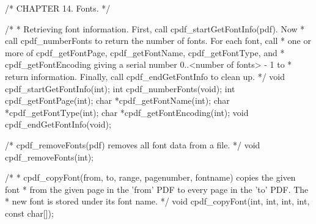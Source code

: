 /* CHAPTER 14. Fonts. */

/*
 * Retrieving font information. First, call cpdf_startGetFontInfo(pdf). Now
 * call cpdf_numberFonts to return the number of fonts. For each font, call
 * one or more of cpdf_getFontPage, cpdf_getFontName, cpdf_getFontType, and
 * cpdf_getFontEncoding giving a serial number 0..<number of fonts> - 1 to
 * return information. Finally, call cpdf_endGetFontInfo to clean up.
 */
void cpdf_startGetFontInfo(int);
int cpdf_numberFonts(void);
int cpdf_getFontPage(int);
char *cpdf_getFontName(int);
char *cpdf_getFontType(int);
char *cpdf_getFontEncoding(int);
void cpdf_endGetFontInfo(void);

/* cpdf_removeFonts(pdf) removes all font data from a file. */
void cpdf_removeFonts(int);

/*
 * cpdf_copyFont(from, to, range, pagenumber, fontname) copies the given font
 * from the given page in the 'from' PDF to every page in the 'to' PDF. The
 * new font is stored under its font name.
 */
void cpdf_copyFont(int, int, int, int, const char[]);

